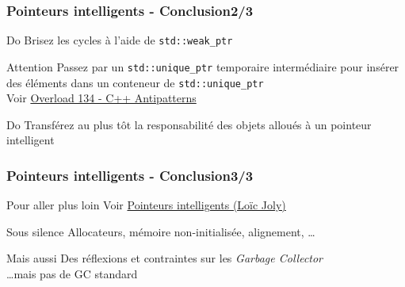 \documentclass[C++.tex]{subfiles}
\begin{document}
\begin{frame}[fragile]
	\frametitle{Pointeurs intelligents - Conclusion\titlehfill{}2/3}
	\begin{exampleblock}{Do}
		Brisez les cycles à l'aide de \lstinline|std::weak_ptr|
	\end{exampleblock}

	\begin{alertblock}{Attention}
		Passez par un \lstinline|std::unique_ptr| temporaire intermédiaire pour insérer des éléments dans un conteneur de \lstinline|std::unique_ptr| \\
		Voir \href{https://accu.org/index.php/journals/2271}{Overload 134 - C++ Antipatterns}

	\end{alertblock}

	\begin{exampleblock}{Do}
		Transférez au plus tôt la responsabilité des objets alloués à un pointeur intelligent
	\end{exampleblock}
\end{frame}

\begin{frame}[fragile]
	\frametitle{Pointeurs intelligents - Conclusion\titlehfill{}3/3}
	\begin{block}{Pour aller plus loin}
		Voir \href{http://loic-joly.developpez.com/tutoriels/cpp/smart-pointers/}{Pointeurs intelligents (Loïc Joly)}
	\end{block}

	\begin{block}{Sous silence}
		Allocateurs, mémoire non-initialisée, alignement, \ldots 
	\end{block}

	\begin{block}{Mais aussi}
		Des réflexions et contraintes sur les \textit{Garbage Collector}\\
		\ldots{}mais pas de GC standard
	\end{block}
\end{frame}
\end{document}
